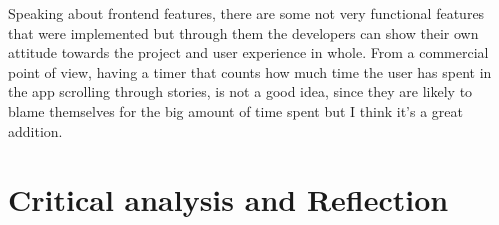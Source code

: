 \documentclass[12pt]{report}
\begin{document}
Speaking about frontend features, there are some not very functional features that were implemented but through them
the developers can show their own attitude towards the project and user experience in whole. From a commercial point of view,
having a timer that counts how much time the user has spent in the app scrolling through stories, is not a good idea,
since they are likely to blame themselves for the big amount of time spent but I think it's a great addition.

\clearpage

\section*{Critical analysis and Reflection}
\paragraph{}








{}

\end{document}
